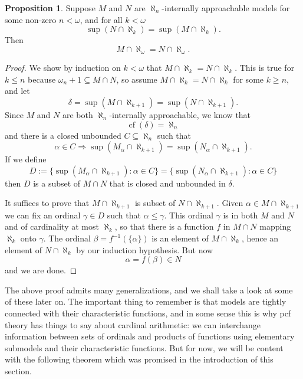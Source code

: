 \documentclass[10pt]{amsart}
\theoremstyle{plain}
\theoremstyle{definition}
\newtheorem{proposition}{Proposition}
\theoremstyle{remark}
\DeclareMathOperator{\cf}{cf}
\numberwithin{equation}{section}
\begin{document}
\begin{proposition}
\label{prop:ModEquProp} Suppose $M$ and $N$ are $\aleph_n$-internally approachable models for some non-zero $n<\omega$, and for
all $k<\omega$
\begin{equation}
\sup(N\cap\aleph_k) = \sup(M\cap\aleph_k).
\end{equation}
Then
\begin{equation}
M\cap\aleph_\omega = N\cap\aleph_\omega.
\end{equation}
\end{proposition}
\begin{proof}
We show by induction on $k<\omega$ that $M\cap\aleph_k = N\cap\aleph_k$. This is true
 for $k\leq n$ because $\omega_n+1\subseteq M\cap N$, so assume $M\cap\aleph_k = N\cap\aleph_k$ for some
 $k\geq n$, and let
 \begin{equation}
 \delta = \sup(M\cap\aleph_{k+1}) = \sup(N\cap\aleph_{k+1}).
 \end{equation}
Since $M$ and $N$ are both $\aleph_n$-internally approachable, we know that
\begin{equation}
\cf(\delta)=\aleph_n
\end{equation}
and there is a closed unbounded $C\subseteq\aleph_n$ such that
\begin{equation}
\alpha\in C\Longrightarrow \sup(M_\alpha\cap\aleph_{k+1}) = \sup(N_\alpha\cap\aleph_{k+1}).
\end{equation}
If we define
\begin{equation}
D:=\{\sup(M_\alpha\cap\aleph_{k+1}):\alpha\in C\}=\{\sup(N_\alpha\cap\aleph_{k+1}):\alpha\in C\}
\end{equation}
then $D$ is a subset of $M\cap N$ that is closed and unbounded in $\delta$.

It suffices to prove that $M\cap\aleph_{k+1}$ is subset of $N\cap\aleph_{k+1}$.  Given $\alpha\in M\cap\aleph_{k+1}$ we
can fix an ordinal $\gamma\in D$ such that $\alpha\leq\gamma$.  This ordinal $\gamma$ is in both $M$ and $N$ and of cardinality
at most $\aleph_k$, so that there is a function $f$ in $M\cap N$ mapping $\aleph_k$ onto $\gamma$.  The ordinal $\beta=f^{-1}(\{\alpha\})$
is an element of $M\cap \aleph_k$, hence an element of $N\cap\aleph_k$ by our induction hypothesis.  But now
\begin{equation}
\alpha = f(\beta) \in N
\end{equation}
and we are done.
\end{proof}

The above proof admits many generalizations, and we shall take a look at some of these later on.  The important thing to remember
is that models are tightly connected with their characteristic functions, and in some sense this is why pcf theory has things to
say about cardinal arithmetic: we can interchange information between sets of ordinals and products of functions using elementary
submodels and their characteristic functions. But for now, we will be content with the following theorem which was promised in
the introduction of this section.
\end{document}
